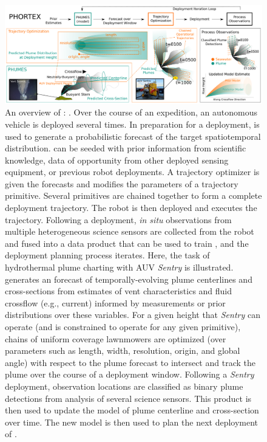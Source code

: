 \begin{figure}[h!]
    \centering
    \includegraphics[width=\columnwidth]{figures/summary_intro_figure_v2.png}
    \caption{An overview of \PHORTEX: \phortex. Over the course of an expedition, an autonomous vehicle is deployed several times. In preparation for a deployment, \PHUMES is used to generate a probabilistic forecast of the target spatiotemporal distribution. \PHUMES can be seeded with prior information from scientific knowledge, data of opportunity from other deployed sensing equipment, or previous robot deployments. A trajectory optimizer is given the forecasts and modifies the parameters of a trajectory primitive. Several primitives are chained together to form a complete deployment trajectory. The robot is then deployed and executes the trajectory. Following a deployment, \emph{in situ} observations from multiple heterogeneous science sensors are collected from the robot and fused into a data product that can be used to train \PHUMES, and the deployment planning process iterates. Here, the task of hydrothermal plume charting with AUV \emph{Sentry} is illustrated. \PHUMES generates an forecast of temporally-evolving plume centerlines and cross-sections from estimates of vent characteristics and fluid crossflow (e.g., current) informed by measurements or prior distributions over these variables. For a given height that \emph{Sentry} can operate (and is constrained to operate for any given primitive), chains of uniform coverage lawnmowers are optimized (over parameters such as length, width, resolution, origin, and global angle) with respect to the plume forecast to intersect and track the plume over the course of a deployment window. Following a \emph{Sentry} deployment, observation locations are classified as binary plume detections from analysis of several science sensors. This product is then used to update the \PHUMES model of plume centerline and cross-section over time. The new \PHUMES model is then used to plan the next deployment of \Sentry.}
    \label{fig:intro_summary}
\end{figure}


